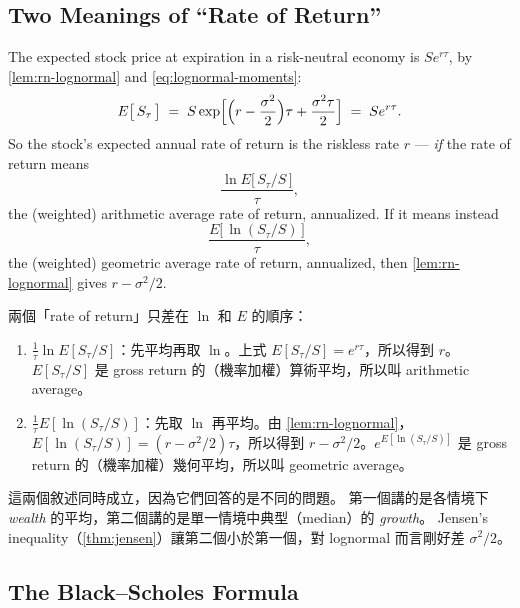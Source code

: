 \subsection{Two Meanings of ``Rate of Return''}


\suppstart
{}
\suppend

The expected stock price at expiration in a risk-neutral economy is $Se^{r\tau}$, by \autoref{lem:rn-lognormal} and \eqref{eq:lognormal-moments}:
\[
	E\bigl[\,S_{\tau}\,\bigr] \;=\; S\exp\Bigl[\Bigl(r-\frac{\sigma^{2}}{2}\Bigr)\tau+\frac{\sigma^{2}\tau}{2}\Bigr] \;=\; Se^{r\tau} .
\]
So the stock's expected annual rate of return is the riskless rate $r$ --- \emph{if} the rate of return means
\[
	\frac{\ln E\bigl[\,S_{\tau}/S\,\bigr]}{\tau} ,
\]
the (weighted) arithmetic average rate of return, annualized.
If it means instead
\[
	\frac{E\bigl[\,\ln(S_{\tau}/S)\,\bigr]}{\tau} ,
\]
the (weighted) geometric average rate of return, annualized, then \autoref{lem:rn-lognormal} gives $r-\sigma^{2}/2$.

\suppstart
\begin{remark}
	兩個「rate of return」只差在 $\ln$ 和 $E$ 的順序：
	\begin{enumerate}[(1),nosep]
		\item $\frac1\tau\ln E[S_{\tau}/S]$：先平均再取 $\ln$。上式 $E[S_{\tau}/S]=e^{r\tau}$，所以得到 $r$。$E[S_{\tau}/S]$ 是 gross return 的（機率加權）算術平均，所以叫 arithmetic average。
		\item $\frac1\tau E[\ln(S_{\tau}/S)]$：先取 $\ln$ 再平均。由 \autoref{lem:rn-lognormal}，$E[\ln(S_{\tau}/S)]=(r-\sigma^{2}/2)\tau$，所以得到 $r-\sigma^{2}/2$。$e^{E[\ln(S_{\tau}/S)]}$ 是 gross return 的（機率加權）幾何平均，所以叫 geometric average。
	\end{enumerate}
\end{remark}

\begin{note}
	這兩個敘述同時成立，因為它們回答的是不同的問題。
	第一個講的是各情境下 \emph{wealth} 的平均，第二個講的是單一情境中典型（median）的 \emph{growth}。
	Jensen's inequality（\autoref{thm:jensen}）讓第二個小於第一個，對 lognormal 而言剛好差 $\sigma^{2}/2$。
\end{note}
\suppend

\subsection{The Black--Scholes Formula}
\label{sec:black-scholes}

